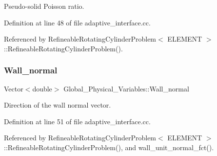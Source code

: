 Pseudo-\/solid Poisson ratio. 



Definition at line 48 of file adaptive\+\_\+interface.\+cc.



Referenced by Refineable\+Rotating\+Cylinder\+Problem$<$ E\+L\+E\+M\+E\+N\+T $>$\+::\+Refineable\+Rotating\+Cylinder\+Problem().

\mbox{\label{namespaceGlobal__Physical__Variables_a5feb3df21fc4a0adefadecb8a8ed98d7}} 
\subsubsection{\texorpdfstring{Wall\+\_\+normal}{Wall\_normal}}
{\footnotesize\ttfamily Vector$<$double$>$ Global\+\_\+\+Physical\+\_\+\+Variables\+::\+Wall\+\_\+normal}



Direction of the wall normal vector. 



Definition at line 51 of file adaptive\+\_\+interface.\+cc.



Referenced by Refineable\+Rotating\+Cylinder\+Problem$<$ E\+L\+E\+M\+E\+N\+T $>$\+::\+Refineable\+Rotating\+Cylinder\+Problem(), and wall\+\_\+unit\+\_\+normal\+\_\+fct().

